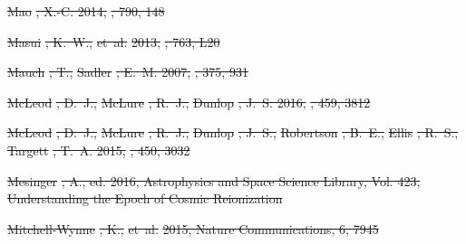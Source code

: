 \documentclass[numberedappendix]{emulateapj}
\providecommand{\DIFdel}[1]{{\protect\color{red}\sout{#1}}}                      %
\begin{document}
\DIFdel{Mao}%
\DIFdel{, X.-C. 2014, }%
\DIFdel{, 790, 148
}%

\DIFdel{Masui}%
\DIFdel{, K.~W., }%
\DIFdel{et~al.}%
\DIFdel{2013, }%
\DIFdel{, 763, L20
}%

\DIFdel{Mauch}%
\DIFdel{, T., }%
\DIFdel{Sadler}%
\DIFdel{, E.~M. 2007, }%
\DIFdel{, 375, 931
}%

\DIFdel{McLeod}%
\DIFdel{, D.~J., }%
\DIFdel{McLure}%
\DIFdel{, R.~J., }%
\DIFdel{Dunlop}%
\DIFdel{, J.~S. 2016, }%
\DIFdel{, 459, 3812
}%

\DIFdel{McLeod}%
\DIFdel{, D.~J., }%
\DIFdel{McLure}%
\DIFdel{, R.~J., }%
\DIFdel{Dunlop}%
\DIFdel{, J.~S., }%
\DIFdel{Robertson}%
\DIFdel{, B.~E., }%
\DIFdel{Ellis}%
\DIFdel{,
  R.~S., }%
\DIFdel{Targett}%
\DIFdel{, T.~A. 2015, }%
\DIFdel{, 450, 3032
}%

\DIFdel{Mesinger}%
\DIFdel{, A., ed. 2016, Astrophysics and Space Science Library, Vol. 423,
  }%
\DIFdel{Understanding the Epoch of Cosmic Reionization}%

\DIFdel{Mitchell-Wynne}%
\DIFdel{, K., }%
\DIFdel{et~al.}%
\DIFdel{2015, Nature Communications, 6, 7945
}%
\end{document}
